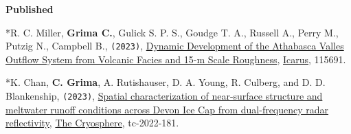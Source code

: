 \textbf{Published}
\begin{etaremune}
\def\labelenumi{\arabic{enumi}.}

\item
  *R. C. Miller, \textbf{Grima C.}, Gulick S. P. S., Goudge T. A., Russell A., Perry M., Putzig N., Campbell B., \texttt{(2023)}, \href{https://www.sciencedirect.com/science/article/pii/S0019103523002683}{Dynamic Development of the Athabasca Valles Outflow System from Volcanic Facies and 15-m Scale Roughness}, \ul{Icarus}, 115691.   

\item
  *K. Chan, \textbf{C. Grima}, A. Rutishauser, D. A. Young, R. Culberg, and D. D. Blankenship, \texttt{(2023)}, \href{https://tc.copernicus.org/preprints/tc-2022-181/}{Spatial characterization of near-surface structure and meltwater runoff conditions across Devon Ice Cap from dual-frequency radar reflectivity}, \ul{The Cryosphere}, tc-2022-181.


\end{etaremune}
